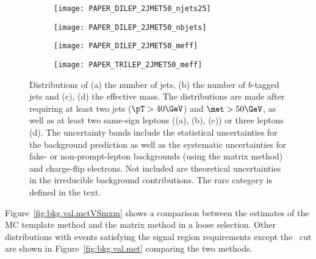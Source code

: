 \begin{figure}[th!]
\centering
\begin{subfigure}[t]{0.49\textwidth}\texttt{[image: PAPER\_DILEP\_2JMET50\_njets25]}\caption{}\label{fig:VRnj}\end{subfigure}
\begin{subfigure}[t]{0.49\textwidth}\texttt{[image: PAPER\_DILEP\_2JMET50\_nbjets]}\caption{}\label{fig:VRnb}\end{subfigure}
\begin{subfigure}[t]{0.49\textwidth}\texttt{[image: PAPER\_DILEP\_2JMET50\_meff]}\caption{}\label{fig:VRmeff1}\end{subfigure}
\begin{subfigure}[t]{0.49\textwidth}\texttt{[image: PAPER\_TRILEP\_2JMET50\_meff]}\caption{}\label{fig:VRmeff2}\end{subfigure}
\caption{
Distributions of (a) the number of jets, (b) the number of $b$-tagged jets and (c), (d) the effective mass. The distributions are made 
after requiring at least two jets ($\pT>40 \GeV$) and $\met>50 \GeV$, as well as at least two same-sign leptons ((a), (b), (c)) 
or three leptons (d). The uncertainty bands include the statistical uncertainties for the background prediction as well as the 
systematic uncertainties for fake- or non-prompt-lepton backgrounds (using the matrix method) and charge-flip electrons. Not included
are theoretical uncertainties in the irreducible background contributions.
The rare category is defined in the text.}
\label{fig:Bkg_distribs} 
\end{figure} 





Figure~\ref{fig:bkg.val.mctVSmxm} shows a comparison between the estimates of the 
MC template method and the matrix method in a loose selection.
Other \met distributions with events satisfying the signal region 
requirements except the \met\ cut are shown in 
Figure~\ref{fig:bkg.val.met} comparing the two methods. 

